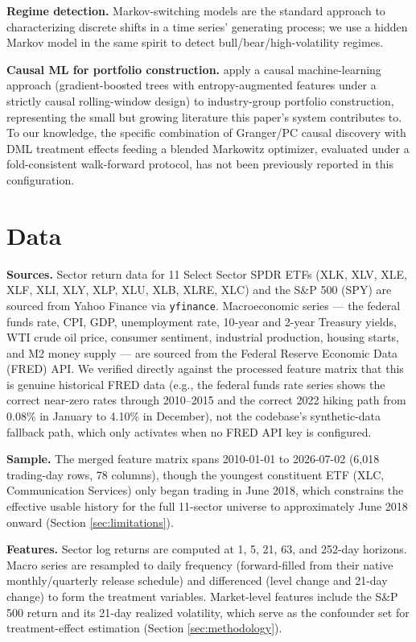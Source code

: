 \documentclass[10pt,twocolumn]{article}
\begin{document}
\textbf{Regime detection.} Markov-switching models
\citep{hamilton1989new} are the standard approach to characterizing
discrete shifts in a time series' generating process; we use a hidden
Markov model in the same spirit to detect bull/bear/high-volatility
regimes.

\textbf{Causal ML for portfolio construction.} \citet{cohen2026entropy}
apply a causal machine-learning approach (gradient-boosted trees with
entropy-augmented features under a strictly causal rolling-window design)
to industry-group portfolio construction, representing the small but
growing literature this paper's system contributes to. To our knowledge,
the specific combination of Granger/PC causal discovery with DML
treatment effects feeding a blended Markowitz optimizer, evaluated under
a fold-consistent walk-forward protocol, has not been previously reported
in this configuration.

\section{Data}

\textbf{Sources.} Sector return data for 11 Select Sector SPDR ETFs
(XLK, XLV, XLE, XLF, XLI, XLY, XLP, XLU, XLB, XLRE, XLC) and the S\&P 500
(SPY) are sourced from Yahoo Finance via \texttt{yfinance}. Macroeconomic
series --- the federal funds rate, CPI, GDP, unemployment rate, 10-year
and 2-year Treasury yields, WTI crude oil price, consumer sentiment,
industrial production, housing starts, and M2 money supply --- are
sourced from the Federal Reserve Economic Data (FRED) API. We verified
directly against the processed feature matrix that this is genuine
historical FRED data (e.g., the federal funds rate series shows the
correct near-zero rates through 2010--2015 and the correct 2022 hiking
path from 0.08\% in January to 4.10\% in December), not the codebase's
synthetic-data fallback path, which only activates when no FRED API key
is configured.

\textbf{Sample.} The merged feature matrix spans 2010-01-01 to
2026-07-02 (6{,}018 trading-day rows, 78 columns), though the youngest
constituent ETF (XLC, Communication Services) only began trading in June
2018, which constrains the effective usable history for the full
11-sector universe to approximately June 2018 onward (Section
\ref{sec:limitations}).

\textbf{Features.} Sector log returns are computed at 1, 5, 21, 63, and
252-day horizons. Macro series are resampled to daily frequency
(forward-filled from their native monthly/quarterly release schedule) and
differenced (level change and 21-day change) to form the treatment
variables. Market-level features include the S\&P 500 return and its
21-day realized volatility, which serve as the confounder set for
treatment-effect estimation (Section \ref{sec:methodology}).
\end{document}
